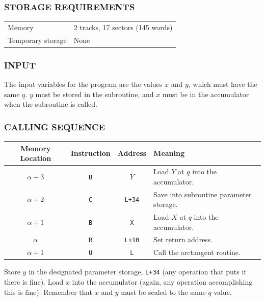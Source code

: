 \subsubsection*{STORAGE REQUIREMENTS}
\begin{center}
\begin{tabular}{ll}
    \toprule
    Memory & 2 tracks, 17 sectors (145 words) \\
    Temporary storage & None \\
    \bottomrule
\end{tabular}
\end{center}

\subsubsection*{INPUT}
The input variables for the program are the values $x$ and $y$, which must have the same $q$. $y$ must be stored in the subroutine, and $x$ must be in the accumulator when the subroutine is called.

\subsubsection*{CALLING SEQUENCE}
\begin{table}[h!]
\centering
\begin{tabularx}{\textwidth}{cccX}
\toprule
\textbf{Memory Location} & \textbf{Instruction} & \textbf{Address} & \textbf{Meaning} \\
\midrule
$\alpha-3$      & \texttt{B} & $Y$                  & Load $Y$ at $q$ into the accumulator.\\
$\alpha+2$    & \texttt{C} & \texttt{L+34} & Save into subroutine parameter storage. \\
$\alpha+1$   & \texttt{B} & \texttt{X} & Load $X$ at $q$ into the accumulator. \\
$\alpha$   & \texttt{R} & \texttt{L+10} & Set return address. \\
$\alpha+1$      & \texttt{U}          & \texttt{L}       & Call the arctangent routine.\\
\bottomrule
\end{tabularx}
\end{table}

Store $y$ in the designated parameter storage, \texttt{L+34} (any operation that puts it there is fine). Load $x$ into the accumulator (again, any operation accomplishing this is fine). Remember that $x$ and $y$ must be scaled to the same $q$ value.

